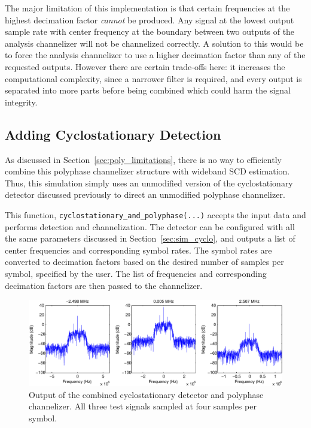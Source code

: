 \documentclass[12pt]{report}
\begin{document}
The major limitation of this implementation is that certain frequencies at the
highest decimation factor \emph{cannot} be produced. Any signal at the lowest
output sample rate with center frequency at the boundary between two outputs of
the analysis channelizer will not be channelized correctly. A solution to this
would be to force the analysis channelizer to use a higher decimation factor
than any of the requested outputs.  However there are certain trade-offs here:
it increases the computational complexity, since a narrower filter is
required, and every output is separated into more parts before being
combined which could harm the signal integrity.

\subsection{Adding Cyclostationary Detection}
\label{sec:sim_poly_cyclo}
As discussed in Section~\ref{sec:poly_limitations}, there is no way to
efficiently combine this polyphase channelizer structure with wideband SCD
estimation.  Thus, this simulation simply uses an unmodified version of the
cyclostationary detector discussed previously to direct an unmodified polyphase
channelizer.

This function, \texttt{cyclostationary\_and\_polyphase(...)} accepts the input
data and performs detection and channelization. The detector can be configured
with all the same parameters discussed in Section~\ref{sec:sim_cyclo}, and
outputs a list of center frequencies and corresponding symbol rates.
The symbol rates are converted to decimation factors based on the desired number
of samples per symbol, specified by the user. The list of frequencies and
corresponding decimation factors are then passed to the channelizer.

\begin{figure}[bh!]
    \includegraphics[width=\textwidth]{cyclo_poly_results}%
\caption{Output of the combined cyclostationary detector and polyphase channelizer. All three test signals sampled at four samples per symbol.}
\label{fig:cyclo_poly_results}
\end{figure}
\end{document}
